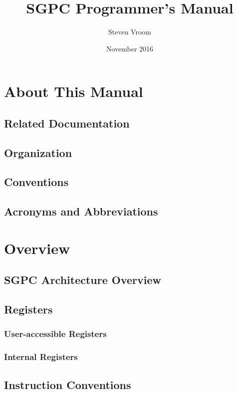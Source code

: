 \documentclass[oneside, a4paper]{memoir}
\begin{document}
\title{SGPC Programmer's Manual}
\author{Steven Vroom}
\date{November 2016}
\maketitle
\cleardoublepage

\setlength\arrayrulewidth{1pt}

\frontmatter
\setcounter{tocdepth}{2}
\tableofcontents
\cleardoublepage

\chapter{About This Manual}
\section{Related Documentation}
\section{Organization}
\section{Conventions}
\section{Acronyms and Abbreviations}

\mainmatter
\chapter{Overview}
\section{SGPC Architecture Overview}
\section{Registers}
\subsection{User-accessible Registers}
\subsection{Internal Registers}
\section{Instruction Conventions}
\end{document}
